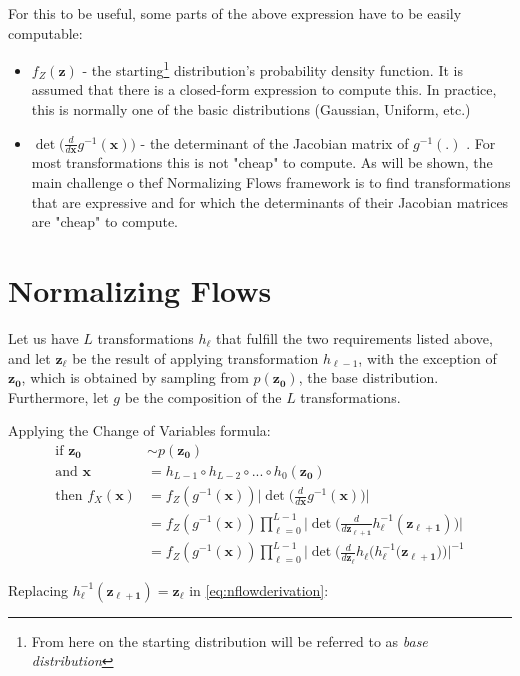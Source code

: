 For this to be useful, some parts of the above expression have to be easily computable:
\begin{itemize}
    \item $f_Z(\bm{z})$ - the starting\footnote{From here on the starting distribution
        will be referred to as \emph{base distribution}} distribution's probability
        density function. It is assumed that there is a closed-form expression to
        compute this. In practice, this is normally one of the basic distributions
        (Gaussian, Uniform, etc.)
    \item $\det\Big(\frac{d}{d\bm{x}}g^{-1}(\bm{x})\Big)$ - the determinant  of the Jacobian
        matrix of $g^{-1}(.)$ . For most transformations this is not "cheap" to compute.
        As will be shown, the main challenge o thef Normalizing Flows framework is
        to find transformations that are expressive and for which the determinants
        of their Jacobian matrices are "cheap" to compute.
\end{itemize}

\section{Normalizing Flows}
Let us have $L$ transformations $h_\ell$ that fulfill the two requirements listed
above, and let $\bm{z_\ell}$ be the result of applying transformation $h_{\ell-1}$, with the
exception of $\bm{z_0}$, which is obtained by sampling from $p(\bm{z_0})$, the base distribution.
Furthermore, let $g$ be the composition of the $L$ transformations.

Applying the Change of Variables formula:
\begin{align}
    \mbox{if } \bm{z_0} &\sim p(\bm{z_0}) \\
    \mbox{and } \bm{x} &= h_{L-1} \circ h_{L-2} \circ ... \circ h_0(\bm{z_0}) \\
    \mbox{then } f_X(\bm{x}) &= f_Z(g^{-1}(\bm{x}))\Big|\det\Big(\frac{d}{d\bm{x}}g^{-1}(\bm{x})\Big)\Big| \\
                        &= f_Z(g^{-1}(\bm{x}))\prod_{\ell=0}^{L-1}\Big|\det\Big(\frac{d}{d\bm{z_{\ell+1}}}h_{\ell}^{-1}(\bm{z_{\ell+1}})\Big)\Big| \\
                        &= f_Z(g^{-1}(\bm{x}))\prod_{\ell=0}^{L-1}\Big|\det\Big(\frac{d}{d\bm{z_{\ell}}}h_{\ell}\Big(h_{\ell}^{-1}(\bm{z_{\ell+1}}\Big)\Big)\Big|^{-1} \label{eq:nflowderivation}
\end{align}

Replacing $h_{\ell}^{-1}(\bm{z_{\ell+1}}) = \bm{z_\ell}$ in \ref{eq:nflowderivation}:

